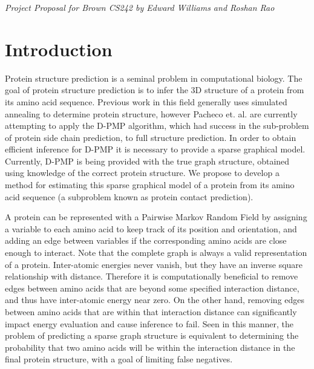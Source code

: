 \documentclass{article}
\begin{document}
\begin{center}
\emph{Project Proposal for Brown CS242 by Edward Williams and Roshan Rao}
\end{center}

\section{Introduction}
\vspace*{-0.1in}
Protein structure prediction is a seminal problem in computational biology. The goal of protein structure prediction is to infer the 3D structure of a protein from its amino acid sequence. Previous work in this field generally uses simulated annealing to determine protein structure, however Pacheco et. al. are currently attempting to apply the D-PMP algorithm, which had success in the sub-problem of protein side chain prediction, to full structure prediction. In order to obtain efficient inference for D-PMP it is necessary to provide a sparse graphical model. Currently, D-PMP is being provided with the true graph structure, obtained using knowledge of the correct protein structure. We propose to develop a method for estimating this sparse graphical model of a protein from its amino acid sequence (a subproblem known as protein contact prediction).

A protein can be represented with a Pairwise Markov Random Field by assigning a variable to each amino acid to keep track of its position and orientation, and adding an edge between variables if the corresponding amino acids are close enough to interact. Note that the complete graph is always a valid representation of a protein. Inter-atomic energies never vanish, but they have an inverse square relationship with distance. Therefore it is computationally beneficial to remove edges between amino acids that are beyond some specified interaction distance, and thus have inter-atomic energy near zero. On the other hand, removing edges between amino acids that are within that interaction distance can significantly impact energy evaluation and cause inference to fail. Seen in this manner, the problem of predicting a sparse graph structure is equivalent to determining the probability that two amino acids will be within the interaction distance in the final protein structure, with a goal of limiting false negatives.
\vspace*{-0.1in}
\end{document}
